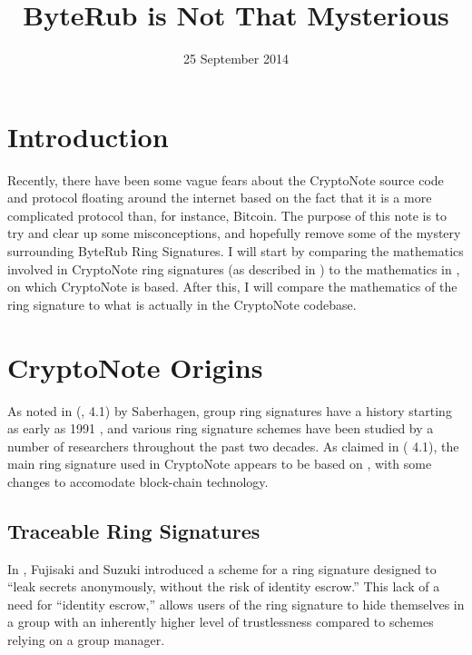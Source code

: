 \documentclass[12pt,english]{mrl}
\numberwithin{equation}{section}
\numberwithin{figure}{section}
\begin{document}
\begin{frontmatter}

\begin{fmbox}
\hfill\setlength{\fboxrule}{0px}\setlength{\fboxsep}{5px}
\title{ByteRub is Not That Mysterious}
\date{25 September 2014}
\author[
   addressref={mrl},
   email={lab@monero.cc}
]{ }


\address[id=mrl]{
}
\end{fmbox}



\end{frontmatter}

\section{Introduction}
Recently, there have been some vague fears about the CryptoNote
source code and protocol floating around the internet based on the
fact that it is a more complicated protocol than, for instance, Bitcoin.
The purpose of this note is to try and clear up some misconceptions,
and hopefully remove some of the mystery surrounding ByteRub Ring Signatures.
I will start by comparing the mathematics involved in CryptoNote
ring signatures (as described in \cite{CN}) to the mathematics in
\cite{FS}, on which CryptoNote is based. After this, I will compare
the mathematics of the ring signature to what is actually in the
CryptoNote codebase. 


\section{CryptoNote Origins}

As noted in (\cite{CN}, 4.1) by Saberhagen, group ring signatures have a history
starting as early as 1991 \cite{CH}, and various ring signature
schemes have been studied by a number of researchers throughout the
past two decades. As claimed in (\cite{CN} 4.1), the main ring signature
used in CryptoNote appears to be based on \cite{FS}, with some changes
to accomodate block-chain technology. 


\subsection{Traceable Ring Signatures}

In \cite{FS}, Fujisaki and Suzuki introduced a scheme for a ring
signature designed to ``leak secrets anonymously, without the risk
of identity escrow.'' This lack of a need for ``identity escrow,''
allows users of the ring signature to hide themselves in a group with
an inherently higher level of trustlessness compared to schemes relying
on a group manager.
\end{document}
